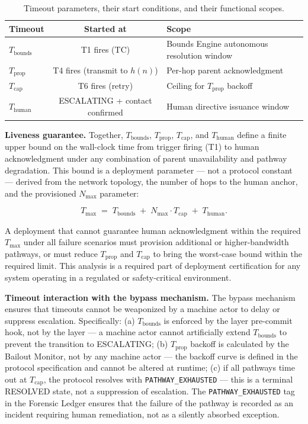 \begin{table}[htbp]
\centering
\caption{Timeout parameters, their start conditions, and their functional scopes.}
\label{tab:timeouts}
\begin{tabular}{lcl}
\hline
\textbf{Timeout} & \textbf{Started at} & \textbf{Scope} \\ \hline
$T_{\text{bounds}}$ & T1 fires (TC) & Bounds Engine autonomous resolution window \\
$T_{\text{prop}}$ & T4 fires (transmit to $h(n)$) & Per-hop parent acknowledgment \\
$T_{\text{cap}}$ & T6 fires (retry) & Ceiling for $T_{\text{prop}}$ backoff \\
$T_{\text{human}}$ & ESCALATING + contact confirmed & Human directive issuance window \\
\hline
\end{tabular}
\end{table}

\medskip\noindent\textbf{Liveness guarantee.} Together, $T_{\text{bounds}}$, $T_{\text{prop}}$, $T_{\text{cap}}$, and $T_{\text{human}}$ define a finite upper bound on the wall-clock time from trigger firing (T1) to human acknowledgment under any combination of parent unavailability and pathway degradation. This bound is a deployment parameter — not a protocol constant — derived from the network topology, the number of hops to the human anchor, and the provisioned $N_{\max}$ parameter:

\begin{equation}
T_{\max} \;=\; T_{\text{bounds}} \;+\; N_{\max} \cdot T_{\text{cap}} \;+\; T_{\text{human}}. \tag{T-max}
\end{equation}

A deployment that cannot guarantee human acknowledgment within the required $T_{\max}$ under all failure scenarios must provision additional or higher-bandwidth pathways, or must reduce $T_{\text{prop}}$ and $T_{\text{cap}}$ to bring the worst-case bound within the required limit. This analysis is a required part of deployment certification for any \bxthree{} system operating in a regulated or safety-critical environment.

\medskip\noindent\textbf{Timeout interaction with the bypass mechanism.} The bypass mechanism ensures that timeouts cannot be weaponized by a machine actor to delay or suppress escalation. Specifically: (a) $T_{\text{bounds}}$ is enforced by the \fact{} layer pre-commit hook, not by the \bounds{} layer — a machine actor cannot artificially extend $T_{\text{bounds}}$ to prevent the transition to ESCALATING; (b) $T_{\text{prop}}$ backoff is calculated by the Bailout Monitor, not by any machine actor — the backoff curve is defined in the protocol specification and cannot be altered at runtime; (c) if all pathways time out at $T_{\text{cap}}$, the protocol resolves with \texttt{PATHWAY\_EXHAUSTED} — this is a terminal RESOLVED state, not a suppression of escalation. The \texttt{PATHWAY\_EXHAUSTED} tag in the Forensic Ledger ensures that the failure of the pathway is recorded as an incident requiring human remediation, not as a silently absorbed exception.